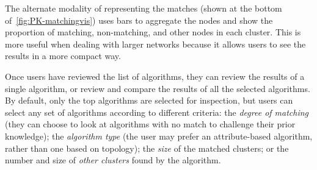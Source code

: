 The alternate modality of representing the matches (shown at the bottom of~\autoref{fig:PK-matchingvis}) uses bars to aggregate the nodes and show the proportion of matching, non-matching, and other nodes in each cluster. This is more useful when dealing with larger networks because it allows users to see the results in a more compact way.







Once users have reviewed the list of algorithms, they can review the results of a single algorithm, or review and compare the results of all the selected algorithms.
By default, only the top algorithms are selected for inspection, but users can select any set of algorithms according to different criteria:
the \textit{degree of matching} (\ie they can choose to look at algorithms with no match to challenge their prior knowledge);
the \textit{algorithm type} (the user may prefer an attribute-based algorithm, rather than one based on topology);
the \textit{size} of the matched clusters;
or the number and size of \textit{other clusters} found by the algorithm.

